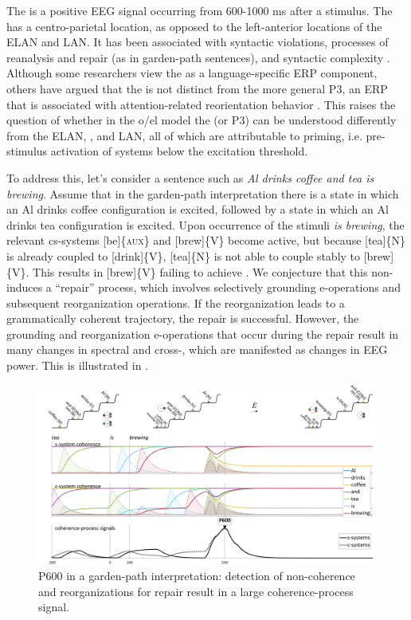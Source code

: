   The  is a positive EEG signal occurring from 600-1000 ms after a stimulus. The  has a centro-parietal location, as opposed to the left-anterior locations of the ELAN and LAN. It has been associated with syntactic violations, processes of reanalysis and repair (as in garden-path sentences), and syntactic complexity \citep{Friederici2002}. Although some researchers view the  as a language-specific ERP component, others have argued that the  is not distinct from the more general P3, an ERP that is associated with attention-related reorientation behavior \citep{SassenhagenBornkessel-Schlesewsky2015}. This raises the question of whether in the o/el model the  (or P3) can be understood differently from the ELAN, , and LAN, all of which are attributable to priming, i.e. pre-stimulus activation of systems below the excitation threshold.

  To address this, let's consider a  sentence such as \textit{Al drinks coffee and tea is brewing}. Assume that in the garden-path interpretation there is a state in which an {\textbar}Al drinks coffee{\textbar} configuration is excited, followed by a state in which an {\textbar}Al drinks tea{\textbar} configuration is excited. Upon occurrence of the stimuli \textit{is brewing}, the relevant cs-sys\-tems [be]\{\textsc{aux}\} and [brew]\{V\} become active, but because [tea]\{N\} is already coupled to [drink]\{V\}, [tea]\{N\} is not able to couple stably to [brew]\{V\}. This results in [brew]\{V\} failing to achieve . We conjecture that this non- induces a “repair” process, which involves selectively grounding e-operations and subsequent reorganization operations. If the reorganization leads to a grammatically coherent trajectory, the repair is successful. However, the grounding and reorganization e-operations that occur during the repair result in many changes in spectral and cross-, which are manifested as changes in EEG power. This is illustrated in {}.

  
\begin{figure}
\includegraphics[width=\textwidth]{figures/Tilsen-img144.png}
\caption{P600 in a garden-path interpretation: detection of non-coherence and reorganizations for repair result in a large coherence-process signal.}
\label{fig:6:25}
\end{figure}
 

